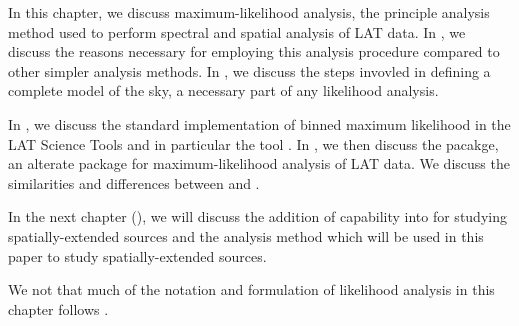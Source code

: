 
In this chapter, we discuss maximum-likelihood analysis, the principle
analysis method used to perform spectral and spatial analysis of
LAT data.  In , we discuss the
reasons necessary for employing this analysis procedure compared to
other simpler analysis methods.  In , we discuss
the steps invovled in defining a complete model of the sky, a necessary
part of any likelihood analysis.

In , we discuss the standard implementation
of binned maximum likelihood in the LAT Science Tools and in particular
the tool \gtlike.
In , we then discuss the \pointlike pacakge,
an alterate package for maximum-likelihood analysis of LAT data. We
discuss the similarities and differences between \pointlike and \gtlike.

In the next chapter (),
we will discuss the addition of capability into \pointlike
for studying spatially-extended sources and the
analysis method which will be used in this paper to study
spatially-extended sources.

We not that much of the notation and formulation of likelihood
analysis in this chapter follows \cite{matthew_kerr_thesis}.


